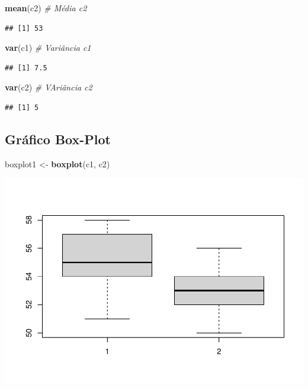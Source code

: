 \documentclass[
]{book}
\newenvironment{Shaded}{\begin{snugshade}}{\end{snugshade}}
\newcommand{\CommentTok}[1]{\textcolor[rgb]{0.56,0.35,0.01}{\textit{#1}}}
\newcommand{\FunctionTok}[1]{\textcolor[rgb]{0.13,0.29,0.53}{\textbf{#1}}}
\newcommand{\NormalTok}[1]{#1}
\newcommand{\OtherTok}[1]{\textcolor[rgb]{0.56,0.35,0.01}{#1}}
\begin{document}
\begin{Shaded}
\begin{Highlighting}[]
\FunctionTok{mean}\NormalTok{(c2) }\CommentTok{\# Média c2}
\end{Highlighting}
\end{Shaded}

\begin{verbatim}
## [1] 53
\end{verbatim}

\begin{Shaded}
\begin{Highlighting}[]
\FunctionTok{var}\NormalTok{(c1) }\CommentTok{\# Variância c1}
\end{Highlighting}
\end{Shaded}

\begin{verbatim}
## [1] 7.5
\end{verbatim}

\begin{Shaded}
\begin{Highlighting}[]
\FunctionTok{var}\NormalTok{(c2) }\CommentTok{\# VAriância c2}
\end{Highlighting}
\end{Shaded}

\begin{verbatim}
## [1] 5
\end{verbatim}

\subsection{Gráfico Box-Plot}\label{gruxe1fico-box-plot}

\begin{Shaded}
\begin{Highlighting}[]
\NormalTok{boxplot1 }\OtherTok{\textless{}{-}} \FunctionTok{boxplot}\NormalTok{(c1, c2)}
\end{Highlighting}
\end{Shaded}

\includegraphics{_main_files/figure-latex/boxplot1-1.pdf}
\end{document}
